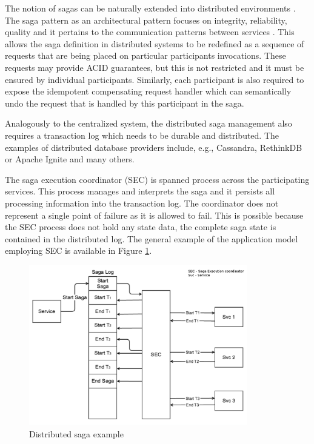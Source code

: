 \documentclass[oneside,
  digital, %
  table,   %
  lof,     %
  lot,     %
]{fithesis3}
\begin{document}
The notion of sagas can be naturally extended into distributed environments \cite{sagas_publ}. The saga pattern as an architectural pattern focuses on integrity, reliability, quality and it pertains to the communication patterns between services \cite{prac_ms}. This allows the saga definition in distributed systems to be redefined as a sequence of requests that are being placed on particular participants invocations. These requests may provide ACID guarantees, but this is not restricted and it must be ensured by individual participants. Similarly, each participant is also required to expose the idempotent compensating request handler which can semantically undo the request that is handled by this participant in the saga.

Analogously to the centralized system, the distributed saga management also requires a transaction log which needs to be durable and distributed. The examples of distributed database providers include, e.g., Cassandra, RethinkDB or Apache Ignite and many others.

The saga execution coordinator (SEC) is spanned process across the participating services. This process manages and interprets the saga and it persists all processing information into the transaction log. The coordinator does not represent a single point of failure as it is allowed to fail. This is possible because the SEC process does not hold any state data, the complete saga state is contained in the distributed log. The general example of the application model employing SEC is available in Figure \ref{fig:SEC}.

\begin{figure}
    \begin{center}
        \includegraphics[height=70mm]{images/SEC.png}
    \end{center}
    \captionsetup{justification=centering}
    \caption{Distributed saga example \cite{applying_saga_pattern}}
    \label{fig:SEC}
\end{figure}
\end{document}
